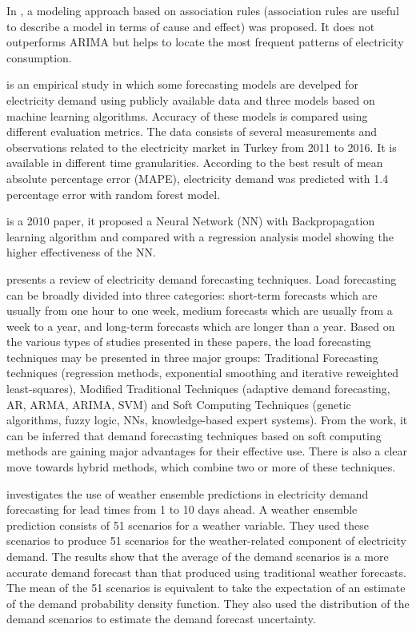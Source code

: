 In \cite{9046493}, a modeling approach based on association rules (association rules are useful to describe a model in terms of cause and effect) was proposed.
It does not outperforms ARIMA but helps to locate the most frequent patterns of electricity consumption.

\cite{8093428} is an empirical study in which some forecasting models are develped for electricity demand using publicly available data and three models based on machine learning algorithms.
Accuracy of these models is compared using different evaluation metrics.
The data consists of several measurements and observations related to the electricity market in Turkey from 2011 to 2016.
It is available in different time granularities.
According to the best result of mean absolute percentage error (MAPE), electricity demand was predicted with 1.4 percentage error with random forest model. 

\cite{5686767} is  a 2010 paper, it proposed a Neural Network (NN) with Backpropagation learning algorithm and compared with a regression analysis model showing the higher effectiveness of the NN.

\cite{singh2013overview} presents a review of electricity demand forecasting techniques.
Load forecasting can be broadly divided into three categories:
short-term forecasts which are usually from one hour to one week,
medium forecasts which are usually from a week to a year,
and long-term forecasts which are longer than a year.
Based on the various types of studies presented in these papers, the load forecasting techniques may be presented in three major groups: Traditional Forecasting techniques (regression methods, exponential smoothing and iterative reweighted least-squares), Modified Traditional Techniques (adaptive demand forecasting, AR, ARMA, ARIMA, SVM) and Soft Computing Techniques (genetic algorithms, fuzzy logic, NNs, knowledge-based expert systems).
From the work, it can be inferred that demand forecasting techniques based on soft computing methods are gaining major advantages for their effective use.
There is also a clear move towards hybrid methods, which combine two or more of these techniques.

\cite{TAYLOR200357} investigates the use of weather ensemble predictions in electricity demand forecasting for lead times from 1 to 10 days ahead.
A weather ensemble prediction consists of 51 scenarios for a weather variable.
They used these scenarios to produce 51 scenarios for the weather-related component of electricity demand.
The results show that the average of the demand scenarios is a more accurate demand forecast than that produced using traditional weather forecasts.
The mean of the 51 scenarios is equivalent to take the expectation of an estimate of the demand probability density function.
They also used the distribution of the demand scenarios to estimate the demand forecast uncertainty.

